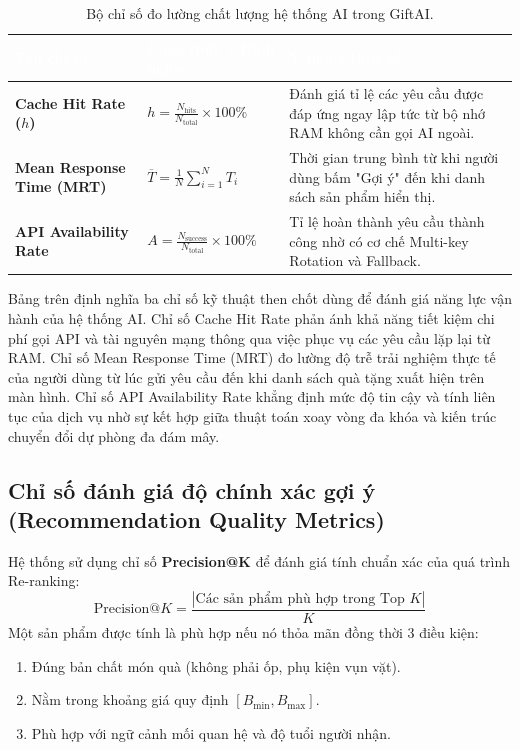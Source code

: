 \begin{table}[htbp]
\centering
\caption{Bộ chỉ số đo lường chất lượng hệ thống AI trong GiftAI.}
\label{tab:ai_metrics}
\small
\renewcommand{\arraystretch}{1.25}
\begin{tabularx}{\textwidth}{|p{3.5cm}|p{3.8cm}|X|}
\hline
\rowcolor{PrimaryBlue}
\textcolor{white}{\textbf{Tên chỉ số}} & 
\textcolor{white}{\textbf{Công thức / Định nghĩa}} & 
\textcolor{white}{\textbf{Ý nghĩa thực tế}} \\
\hline
\textbf{Cache Hit Rate ($h$)} & $h = \frac{N_{\text{hits}}}{N_{\text{total}}} \times 100\%$ & Đánh giá tỉ lệ các yêu cầu được đáp ứng ngay lập tức từ bộ nhớ RAM không cần gọi AI ngoài. \\
\hline
\textbf{Mean Response Time (MRT)} & $\overline{T} = \frac{1}{N} \sum_{i=1}^{N} T_i$ & Thời gian trung bình từ khi người dùng bấm "Gợi ý" đến khi danh sách sản phẩm hiển thị. \\
\hline
\textbf{API Availability Rate} & $A = \frac{N_{\text{success}}}{N_{\text{total}}} \times 100\%$ & Tỉ lệ hoàn thành yêu cầu thành công nhờ có cơ chế Multi-key Rotation và Fallback. \\
\hline
\end{tabularx}
\end{table}

Bảng trên định nghĩa ba chỉ số kỹ thuật then chốt dùng để đánh giá năng lực vận hành của hệ thống AI. Chỉ số Cache Hit Rate phản ánh khả năng tiết kiệm chi phí gọi API và tài nguyên mạng thông qua việc phục vụ các yêu cầu lặp lại từ RAM. Chỉ số Mean Response Time (MRT) đo lường độ trễ trải nghiệm thực tế của người dùng từ lúc gửi yêu cầu đến khi danh sách quà tặng xuất hiện trên màn hình. Chỉ số API Availability Rate khẳng định mức độ tin cậy và tính liên tục của dịch vụ nhờ sự kết hợp giữa thuật toán xoay vòng đa khóa và kiến trúc chuyển đổi dự phòng đa đám mây.

\subsection{Chỉ số đánh giá độ chính xác gợi ý (Recommendation Quality Metrics)}
Hệ thống sử dụng chỉ số \textbf{Precision@K} để đánh giá tính chuẩn xác của quá trình Re-ranking:
\begin{equation}
    \text{Precision}@K = \frac{|\text{Các sản phẩm phù hợp trong Top } K|}{K}
\end{equation}
Một sản phẩm được tính là phù hợp nếu nó thỏa mãn đồng thời 3 điều kiện:
\begin{enumerate}
    \item Đúng bản chất món quà (không phải ốp, phụ kiện vụn vặt).
    \item Nằm trong khoảng giá quy định $[B_{\min}, B_{\max}]$.
    \item Phù hợp với ngữ cảnh mối quan hệ và độ tuổi người nhận.
\end{enumerate}

